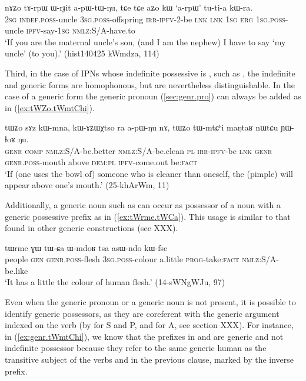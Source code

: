 \begin{exe}
\ex  \label{ex:tArpW}
\gll
nɤʑo 	tɤ-rpɯ 	ɯ-rɟit 	a-pɯ-tɯ-ŋu, 	tɕe 	tɕe 	aʑo 	kɯ 	`a-rpɯ' 	tu-ti-a 	kɯ-ra.  \\
\textsc{2sg} \textsc{indef.poss}-uncle \textsc{3sg.poss}-offspring \textsc{irr-ipfv}-2-be \textsc{lnk} \textsc{lnk} \textsc{1sg} \textsc{erg}  \textsc{1sg.poss}-uncle \textsc{ipfv}-say-\textsc{1sg} \textsc{nmlz:S/A}-have.to  \\
\glt `If you are the maternal uncle's son, (and I am the nephew) I have to say `my uncle' (to you).'  (hist140425 kWmdza, 114)
\end{exe}

Third, in the case of IPNs whose indefinite possessive is , such as , the indefinite and generic forms are homophonous, but are nevertheless distinguishable. In the case of a generic form the generic pronoun  (\ref{sec:genr.pro}) can always be added as in (\ref{ex:tWZo.tWmtChi}). 

\begin{exe}
\ex  \label{ex:tWZo.tWmtChi}
\gll tɯʑo sɤz kɯ-mna, kɯ-ɤʑɯχtso ra a-pɯ-ŋu nɤ,  tɯʑo tɯ-mtɕʰi maŋtaʁ nɯtɕu ɲɯ-ɬoʁ ŋu. \\
\textsc{genr} \textsc{comp} \textsc{nmlz}:S/A-be.better \textsc{nmlz}:S/A-be.clean \textsc{pl} \textsc{irr}-\textsc{ipfv}-be \textsc{lnk}  \textsc{genr} \textsc{genr.poss}-mouth above \textsc{dem:pl} \textsc{ipfv}-come.out be:\textsc{fact} \\
\glt `If (one uses the bowl of) someone who is cleaner than oneself, the (pimple) will appear above one's mouth.' (25-khArWm, 11)
\end{exe}

Additionally, a generic noun such as  can occur as possessor of a noun with a generic possessive prefix as in (\ref{ex:tWrme.tWCa}). This usage is similar to that found in other generic constructions (see XXX).

\begin{exe}
\ex  \label{ex:tWrme.tWCa}
\gll tɯrme ɣɯ tɯ-ɕa ɯ-mdoʁ tsa asɯ-ndo kɯ-fse \\
people \textsc{gen} \textsc{genr.poss}-flesh \textsc{3sg.poss}-colour a.little \textsc{prog}-take:\textsc{fact} \textsc{nmlz}:S/A-be.like \\
\glt `It has a little the colour of human flesh.' (14-sWNgWJu, 97)
\end{exe}

Even when the generic pronoun or a generic noun is not present, it is possible to identify generic possessors, as they are coreferent with the generic argument indexed on the verb (by  for S and P, and  for A, see section XXX). For instance, in (\ref{ex:genr.tWmtChi}), we know that  the  prefixes in  and   are generic and not indefinite possessor because they refer to the same generic human as the transitive subject of the verbs  and  in the previous clause, marked by the inverse prefix.

